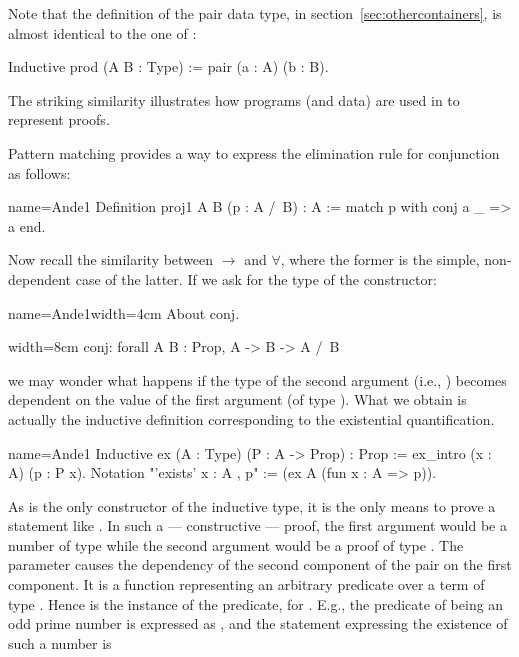 Note that the definition of the pair data type,
in section~\ref{sec:othercontainers}, is almost identical to the one
of :

\begin{coq}{}{}
Inductive prod (A B : Type) := pair (a : A) (b : B).
\end{coq}
The striking similarity illustrates how programs (and data) are used in \Coq{}
to represent proofs.

Pattern matching provides a way to express the elimination rule for
conjunction as follows:

\begin{coq}{name=Ande1}{}
Definition proj1 A B (p : A /\ B) : A :=
  match p with conj a _ => a end.
\end{coq}

Now recall the similarity between $\to$ and $\forall$, where the former is the
simple, non-dependent case of the latter.  If we ask for the type of
the  constructor:

\begin{coq-left}{name=Ande1}{width=4cm}
About conj.
\end{coq-left}
\begin{coqout-right}{}{width=8cm}
conj: forall A B : Prop, A -> B -> A /\ B
\end{coqout-right}

we may wonder what happens if the type of the second argument (i.e., )
becomes dependent on the value of the first argument (of type ).
What we obtain is actually the inductive definition corresponding to the
existential quantification.

\begin{coq}{name=Ande1}{}
Inductive ex (A : Type) (P : A -> Prop) : Prop :=
  ex_intro (x : A) (p : P x).
Notation "'exists' x : A , p" := (ex A (fun x : A => p)).
\end{coq}

As   is the only constructor of the  inductive
type, it is the only means to prove a statement like
.  In such a --- constructive --- proof, the first
argument would be a number
 of type  while the second argument would be a proof  of type
.  The parameter  causes the dependency of the
second component of the pair on the first component. It is a function
representing an arbitrary predicate over a term of
type .  Hence  is the instance of the predicate, for .  E.g.,
the predicate of being an odd prime number is expressed as
, and the statement expressing the
existence of such a number is


